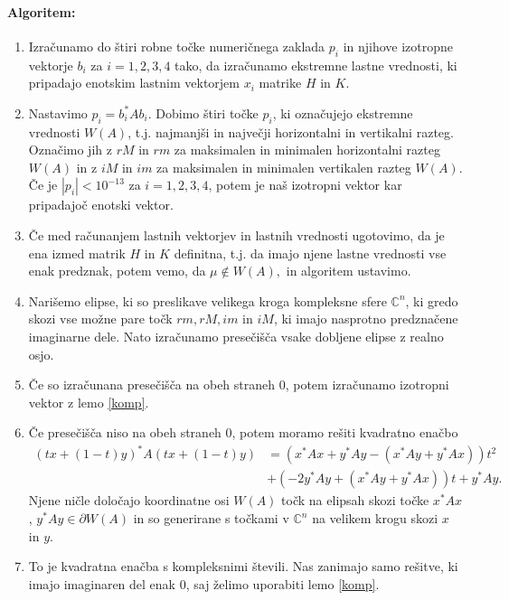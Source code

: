 \documentclass[12pt,a4paper]{amsart}
\theoremstyle{definition}
\theoremstyle{plain}
\newcommand{\C}{\mathbb C}
\begin{document}
\paragraph{Algoritem:}
\begin{enumerate}[1.]
\item Izračunamo do štiri robne točke numeričnega zaklada $p_i$ in njihove izotropne vektorje $b_i$ za $i=1,2,3,4$ tako, da izračunamo ekstremne lastne vrednosti, ki pripadajo enotskim lastnim vektorjem $x_i$ %
matrike $H$ in $K$.
\item Nastavimo $p_i =b^\ast _i Ab_i$. Dobimo štiri točke $p_i$, ki označujejo ekstremne vrednosti $W(A)$, t.j. najmanjši in največji horizontalni in vertikalni razteg. Označimo jih z $rM$ in $rm$ za maksimalen in minimalen horizontalni razteg $W(A)$ in z $iM$ in $im$ za maksimalen in minimalen vertikalen razteg $W(A)$. Če je $|p_i|<10^{-13}$ za $i=1,2,3,4$, potem je naš izotropni vektor kar pripadajoč enotski vektor.
\item Če med računanjem lastnih vektorjev in lastnih vrednosti ugotovimo, da je ena izmed matrik $H$ in $K$ definitna, t.j. da imajo njene lastne vrednosti vse enak predznak, potem vemo, da $\mu \not\in W(A),$ in algoritem ustavimo.
\item Narišemo elipse, ki so preslikave velikega kroga kompleksne sfere $\C^n$, ki gredo skozi vse možne pare točk $rm, rM, im$ in $iM$, ki imajo nasprotno predznačene imaginarne dele. Nato izračunamo presečišča vsake dobljene elipse z realno osjo.%
\item Če so izračunana presečišča na obeh straneh 0, potem izračunamo izotropni vektor z lemo \ref{komp}.
\item Če presečišča niso na obeh straneh 0, potem moramo rešiti kvadratno enačbo 
\begin{align}\label{eq:en3}
(tx +(1-t)y)^\ast A(tx+(1-t)y) & =(x^\ast Ax+y^\ast Ay -(x^\ast Ay +y^\ast Ax))t^2 \\
&+(-2y^\ast Ay +(x^\ast Ay+y^\ast Ax))t +y^\ast Ay.\nonumber
\end{align}
Njene ničle določajo koordinatne osi $W(A)$ točk na elipsah skozi točke $x^\ast Ax$, $y^\ast Ay\in \partial W(A)$ %
in so generirane s točkami v $\C^n$ na velikem krogu skozi $x$ in $y$. 
\item To je kvadratna enačba s kompleksnimi števili. Nas zanimajo samo rešitve, ki imajo imaginaren del enak 0, saj želimo uporabiti lemo \ref{komp}.

\end{enumerate}
\end{document}
